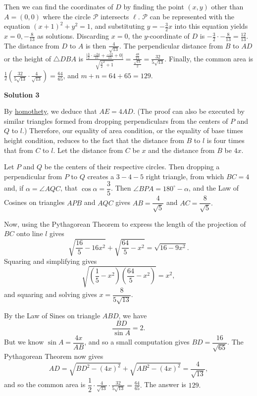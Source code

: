 \begin{enumerate}
 
Then we can find the coordinates of $D$ by finding the point $(x,y)$ other than $A = (0,0)$ where the circle $\mathcal{P}$ intersects $\ell$. $\mathcal{P}$ can be represented with the equation $(x + 1)^2 + y^2 = 1$, and substituting $y = -\frac{3}{2}x$ into this equation yields $x = 0, -\frac{8}{13}$ as solutions. Discarding $x = 0$, the $y$-coordinate of $D$ is  $-\frac{3}{2} \cdot -\frac{8}{13} = \frac{12}{13}$. The distance from $D$ to $A$ is then $\frac{4}{\sqrt{13}}.$ The perpendicular distance from $B$ to $AD$ or the height of $\triangle{DBA}$ is $\frac{|\frac{3}{2}\cdot\frac{-24}{15} + \frac{-12}{15} + 0|}{\sqrt{\frac{3}{2}^2 + 1}} = \frac{\frac{48}{15}}{\frac{\sqrt{13}}{2}} = \frac{32}{5\sqrt{13}}.$ Finally, the common area is $\frac{1}{2}\left(\frac{32}{5\sqrt{13}} \cdot \frac{4}{\sqrt{13}}\right) = \frac{64}{65}$, and $m + n = 64 + 65 = \boxed{129}$.

 



\textbf{Solution 3}

By \href{https://artofproblemsolving.com/wiki/index.php?title=Homothety}{homothety}, we deduce that $AE = 4 AD$. (The proof can also be executed by similar triangles formed from dropping perpendiculars from the centers of $P$ and $Q$ to $l$.) Therefore, our equality of area condition, or the equality of base times height condition, reduces to the fact that the distance from $B$ to $l$ is four times that from $C$ to $l$. Let the distance from $C$ be $x$ and the distance from $B$ be $4x$.

 Let $P$ and $Q$ be the centers of their respective circles. Then dropping a perpendicular from $P$ to $Q$ creates a $3-4-5$ right triangle, from which $BC = 4$ and, if $\alpha = \angle{AQC}$, that $\cos \alpha = \dfrac{3}{5}$. Then $\angle{BPA} = 180^\circ - \alpha$, and the Law of Cosines on triangles $APB$ and $AQC$ gives $AB = \dfrac{4}{\sqrt{5}}$ and $AC = \dfrac{8}{\sqrt{5}}.$

 Now, using the Pythagorean Theorem to express the length of the projection of $BC$ onto line $l$ gives
 \[\sqrt{\frac{16}{5} - 16x^2} + \sqrt{\frac{64}{5} - x^2} = \sqrt{16 - 9x^2}.\]Squaring and simplifying gives
 \[\sqrt{\left(\frac{1}{5} - x^2\right)\left(\frac{64}{5} - x^2\right)} = x^2,\]and squaring and solving gives $x = \dfrac{8}{5\sqrt{13}}.$

 By the Law of Sines on triangle $ABD$, we have
 \[\frac{BD}{\sin A} = 2.\]But we know $\sin A = \dfrac{4x}{AB}$, and so a small computation gives $BD = \dfrac{16}{\sqrt{65}}.$ The Pythagorean Theorem now gives
 \[AD = \sqrt{BD^2 - (4x)^2} + \sqrt{AB^2 - (4x)^2} = \frac{4}{\sqrt{13}},\]and so the common area is $\dfrac{1}{2} \cdot \frac{4}{\sqrt{13}} \cdot \frac{32}{5\sqrt{13}} = \frac{64}{65}.$ The answer is $\boxed{129}.$


\end{enumerate}
